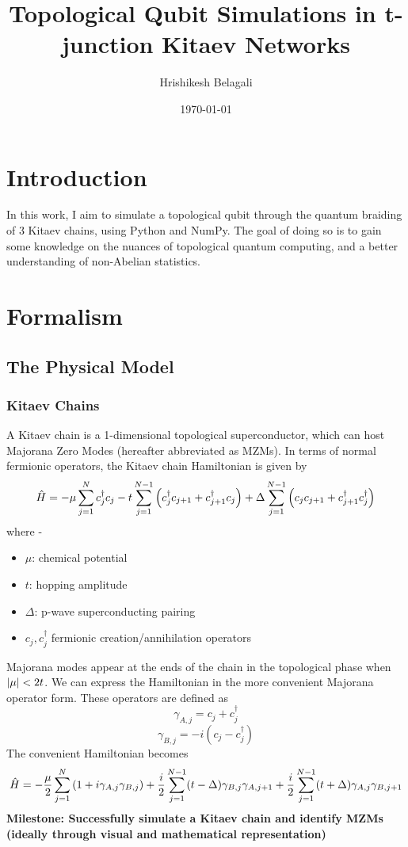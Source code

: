 \documentclass{article}
\title{Topological Qubit Simulations in t-junction Kitaev Networks}
\author{Hrishikesh Belagali}
\date{\today}
\newcommand{\0}{\mathbf{0}} %
\begin{document}
\maketitle

\section{Introduction}
In this work, I aim to simulate a topological qubit through the quantum braiding of 3 Kitaev chains, using Python and NumPy.
The goal of doing so is to gain some knowledge on the nuances of topological quantum computing, and a better understanding of non-Abelian statistics.
\section{Formalism}
\subsection{The Physical Model}
\subsubsection{Kitaev Chains}
A Kitaev chain is a 1-dimensional topological superconductor, which can host Majorana Zero Modes (hereafter abbreviated as MZMs). In terms of normal fermionic operators, the Kitaev chain Hamiltonian is given by
$$\hat H = -\mu \sum_{j=1}^N c_j^{\dagger}c_j - t\sum_{j=1}^{N-1} \pqty{c_j^{\dagger}c_{j+1} + c_{j+1}^\dagger c_j} + \Delta \sum_{j=1}^{N-1} \pqty{c_jc_{j+1} + c^{\dagger}_{j+1} c_j^{\dagger}}$$ 
where - 
\begin{itemize}
    \item $\mu$: chemical potential 
    \item $t$: hopping amplitude
    \item $\Delta$: p-wave superconducting pairing
    \item $c_j, c_j^{\dagger}$ fermionic creation/annihilation operators
\end{itemize}
Majorana modes appear at the ends of the chain in the topological phase when $\abs{\mu} < 2t$.
We can express the Hamiltonian in the more convenient Majorana operator form. These operators are defined as
$$\gamma_{A, j} = c_j + c_j^{\dagger}$$
$$\gamma_{B, j} = -i(c_j - c_j^{\dagger})$$ 
The convenient Hamiltonian becomes
$$\hat H = -\frac{\mu}{2}\sum_{j=1}^N \pqty{1 + i \gamma_{A, j}\gamma_{B, j}} + \frac{i}{2}\sum_{j=1}^{N-1} (t - \Delta) \gamma_{B, j}\gamma_{A, j+1} + \frac{i}{2}\sum_{j=1}^{N-1}(t + \Delta)\gamma_{A, j}\gamma_{B, j+1}$$
\textbf{Milestone: Successfully simulate a Kitaev chain and identify MZMs (ideally through visual and mathematical representation)}
\end{document}
